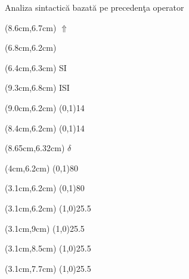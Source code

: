 \documentclass[pdf]{beamer}
\begin{document}
\begin{frame}{Analiza sintactică bazată pe precedenţa operator}
\begin{textblock*}{11cm}(8.6cm,6.7cm)
$\Uparrow$
\end{textblock*}

\begin{textblock*}{11cm}(6.8cm,6.2cm)
\end{textblock*}

\begin{textblock*}{11cm}(6.4cm,6.3cm)
SI
\end{textblock*}

\begin{textblock*}{11cm}(9.3cm,6.8cm)
ISI
\end{textblock*}

\begin{textblock*}{11cm}(9.0cm,6.2cm)
\line(0,1){14}
\end{textblock*}

\begin{textblock*}{11cm}(8.4cm,6.2cm)
\line(0,1){14}
\end{textblock*}

\begin{textblock*}{11cm}(8.65cm,6.32cm)
$\delta$
\end{textblock*}

\begin{textblock*}{11cm}(4cm,6.2cm)
\line(0,1){80}
\end{textblock*}

\begin{textblock*}{11cm}(3.1cm,6.2cm)
\line(0,1){80}
\end{textblock*}

\begin{textblock*}{11cm}(3.1cm,6.2cm)
\line(1,0){25.5}
\end{textblock*}

\begin{textblock*}{11cm}(3.1cm,9cm)
\line(1,0){25.5}
\end{textblock*}

\begin{textblock*}{11cm}(3.1cm,8.5cm)
\line(1,0){25.5}
\end{textblock*}

\begin{textblock*}{11cm}(3.1cm,7.7cm)
\line(1,0){25.5}
\end{textblock*}


\end{frame}
\end{document}
